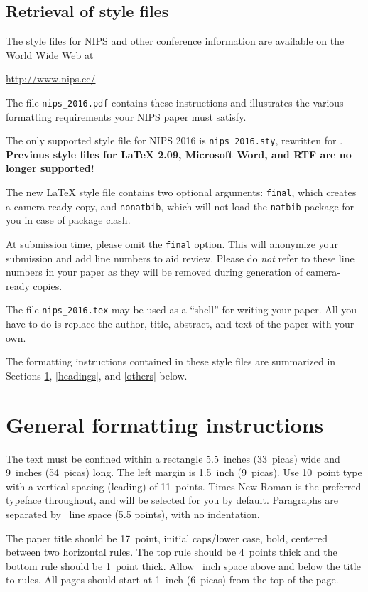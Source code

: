 \documentclass{article}
\begin{document}
\subsection{Retrieval of style files}

The style files for NIPS and other conference information are
available on the World Wide Web at
\begin{center}
  \url{http://www.nips.cc/}
\end{center}
The file \verb+nips_2016.pdf+ contains these instructions and
illustrates the various formatting requirements your NIPS paper must
satisfy.

The only supported style file for NIPS 2016 is \verb+nips_2016.sty+,
rewritten for \LaTeXe{}.  \textbf{Previous style files for \LaTeX{}
  2.09, Microsoft Word, and RTF are no longer supported!}

The new \LaTeX{} style file contains two optional arguments:
\verb+final+, which creates a camera-ready copy, and \verb+nonatbib+,
which will not load the \verb+natbib+ package for you in case of
package clash.

At submission time, please omit the \verb+final+ option. This will
anonymize your submission and add line numbers to aid review.  Please
do \emph{not} refer to these line numbers in your paper as they will
be removed during generation of camera-ready copies.

The file \verb+nips_2016.tex+ may be used as a ``shell'' for writing
your paper. All you have to do is replace the author, title, abstract,
and text of the paper with your own.

The formatting instructions contained in these style files are
summarized in Sections \ref{gen_inst}, \ref{headings}, and
\ref{others} below.

\section{General formatting instructions}
\label{gen_inst}

The text must be confined within a rectangle 5.5~inches (33~picas)
wide and 9~inches (54~picas) long. The left margin is 1.5~inch
(9~picas).  Use 10~point type with a vertical spacing (leading) of
11~points.  Times New Roman is the preferred typeface throughout, and
will be selected for you by default.  Paragraphs are separated by
~line space (5.5 points), with no indentation.

The paper title should be 17~point, initial caps/lower case, bold,
centered between two horizontal rules. The top rule should be 4~points
thick and the bottom rule should be 1~point thick. Allow
~inch space above and below the title to rules. All
pages should start at 1~inch (6~picas) from the top of the page.
\end{document}

